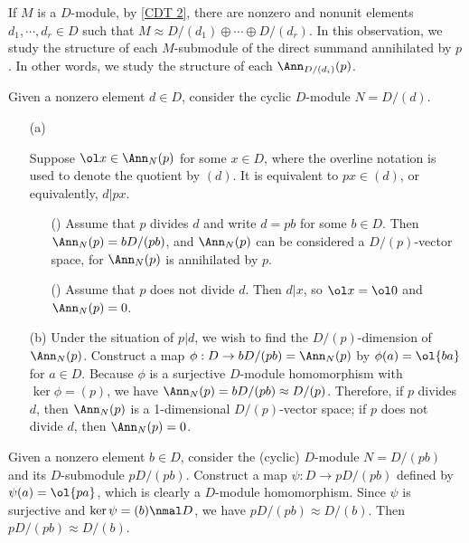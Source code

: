 \begin{obs}\label{the structure of each Ann(direct summand)}
    If $M$ is a $D$-module, by \cref{CDT 2}, there are nonzero and nonunit elements $d_1, \cdots, d_r\in D$ such that $M\approx D/(d_1)\oplus\cdots\oplus D/(d_r)$.
    In this observation, we study the structure of each $M$-submodule of the direct summand annihilated by $p$.
    In other words, we study the structure of each $\Ann_{D/(d_i)}(p)$.

    Given a nonzero element $d\in D$, consider the cyclic $D$-module $N=D/(d)$.
    \begin{enumerate}
        \item[(a)]
        {
            Suppose $\ol x\in\Ann_N(p)$ for some $x\in D$, where the overline notation is used to denote the quotient by $(d)$.
            It is equivalent to $px\in (d)$, or equivalently, $d|px$.
            \begin{enumerate}
                \item[(\romannumeral 1)]
                {
                    Assume that $p$ divides $d$ and write $d=pb$ for some $b\in D$.
                    Then $\Ann_N(p)=bD/(pb)$, and $\Ann_N(p)$ can be considered a $D/(p)$-vector space, for $\Ann_N(p)$ is annihilated by $p$.
                }
                \item[(\romannumeral 2)]
                {
                    Assume that $p$ does not divide $d$.
                    Then $d|x$, so $\ol x=\ol 0$ and $\Ann_N(p)=0$.
                }
            \end{enumerate}
        }
        \item[(b)]
        {
            Under the situation of $p|d$, we wish to find the $D/(p)$-dimension of $\Ann_N(p)$.
            Construct a map $\phi: D\rightarrow bD/(pb)=\Ann_N(p)$ by $\phi(a)=\ol{ba}$ for $a\in D$.
            Because $\phi$ is a surjective $D$-module homomorphism with $\ker\phi=(p)$, we have $\Ann_N(p)=bD/(pb)\approx D/(p)$.
            Therefore, if $p$ divides $d$, then $\Ann_N(p)$ is a 1-dimensional $D/(p)$-vector space; if $p$ does not divide $d$, then $\Ann_N(p)=0$.
        }
    \end{enumerate}
\end{obs}
\begin{obs}
    Given a nonzero element $b\in D$, consider the (cyclic) $D$-module $N=D/(pb)$ and its $D$-submodule $pD/(pb)$.
    Construct a map $\psi: D\rightarrow pD/(pb)$ defined by $\psi(a)=\ol{pa}$, which is clearly a $D$-module homomorphism.
    Since $\psi$ is surjective and $\ker\psi=(b)\nmal D$, we have $pD/(pb)\approx D/(b)$.
    Then $pD/(pb)\approx D/(b)$.
\end{obs}

